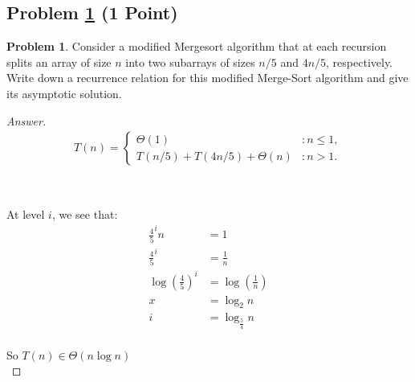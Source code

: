\documentclass[11pt]{article}
\theoremstyle{definition}
\theoremstyle{definition}
\newtheorem{required}{Problem}
\theoremstyle{definition}
\begin{document}
\newpage 
\subsection{Problem \ref{modmergetime1} (1 Point)}
\begin{required}\label{modmergetime1}
Consider a modified Mergesort algorithm that at each recursion splits an array of size $n$ into two subarrays of sizes $n/5$ and $4n/5$, respectively. Write down a recurrence relation for this modified Merge-Sort algorithm and give its asymptotic solution.

\begin{proof}[Answer]
\begin{align*}
T(n) = \begin{cases}
\Theta(1) & : n \leq 1, \\
T(n/5) + T(4n/5) + \Theta(n) & : n > 1.
\end{cases}
\end{align*}

\begin{center}
	\\
\end{center}

At level $i$, we see that:
\begin{align*}
	\frac{4}{5}^in &= 1\\
	\frac{4}{5}^i &= \frac{1}{n}\\
	\log(\frac{4}{5})^i &= \log(\frac{1}{n})\\
	x &= \log_2n\\
	i &= \log_{\frac{5}{4}}n\\
\end{align*}

So $T(n) \in \Theta(n \log n)$\\


\end{proof}
\end{required}

\newpage 
\end{document}

